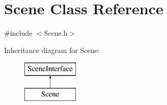 \hypertarget{class_scene}{}\section{Scene Class Reference}
\label{class_scene}


{\ttfamily \#include $<$Scene.\+h$>$}

Inheritance diagram for Scene\+:\begin{figure}[H]
\begin{center}
\leavevmode
\includegraphics[height=2.000000cm]{class_scene}
\end{center}
\end{figure}
